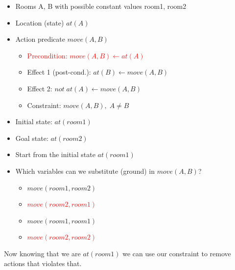 \begin{minipage}[t]{0.5\textwidth}
    \begin{itemize}
        \item Rooms A, B with possible constant values room1, room2
        \item Location (state) $at(A)$
        \item Action predicate $move(A, B)$
        \begin{itemize}
            \item \textcolor{red}{Precondition: $move(A, B) \leftarrow at(A)$}
            \item Effect 1 (post-cond.): $at(B) \leftarrow move(A, B)$
            \item Effect 2: $not\;at(A) \leftarrow move(A, B)$
            \item Constraint: $move(A, B),\;A \ne B$
        \end{itemize}
        \item Initial state: $at(room1)$
        \item Goal state: $at(room2)$
    \end{itemize}
\end{minipage}
\begin{minipage}[t]{0.8\textwidth}
    \begin{itemize}
        \item Start from the initial state $at(room1)$
        \item Which variables can we substitute (ground) in $move(A, B)$?
        \begin{itemize}
            \item $move(room1, room2)$
            \item \textcolor{red}{\st{$move(room2, room1)$}}
            \item $move(room1, room1)$
            \item \textcolor{red}{\st{$move(room2, room2)$}}
        \end{itemize}
    \end{itemize}
\end{minipage}
\newpage
\noindent
Now knowing that we are $at(room1)$ we can use our constraint to remove actions that violates that.\\

